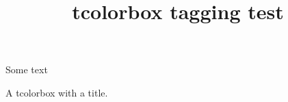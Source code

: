 \documentclass{article}
\title{tcolorbox tagging test}
\begin{document}
\begin{tcolorbox}
Some text
\end{tcolorbox}

\begin{tcolorbox}[title=A title]
A tcolorbox with a title.
\end{tcolorbox}
\end{document}
